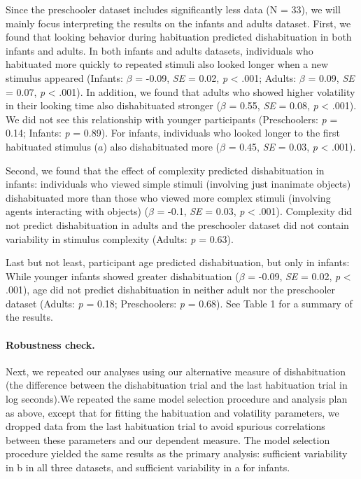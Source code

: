 \documentclass[10pt, letterpaper]{article}
\begin{document}
Since the preschooler dataset includes significantly less data (N = 33),
we will mainly focus interpreting the results on the infants and adults
dataset. First, we found that looking behavior during habituation
predicted dishabituation in both infants and adults. In both infants and
adults datasets, individuals who habituated more quickly to repeated
stimuli also looked longer when a new stimulus appeared (Infants:
\(\beta\) = -0.09, \emph{SE} = 0.02, \emph{p} \textless{} .001; Adults:
\(\beta\) = 0.09, \emph{SE} = 0.07, \emph{p} \textless{} .001). In
addition, we found that adults who showed higher volatility in their
looking time also dishabituated stronger (\(\beta\) = 0.55, \emph{SE} =
0.08, \emph{p} \textless{} .001). We did not see this relationship with
younger participants (Preschoolers: \emph{p} = 0.14; Infants: \emph{p} =
0.89). For infants, individuals who looked longer to the first
habituated stimulus (\(a\)) also dishabituated more (\(\beta\) = 0.45,
\emph{SE} = 0.03, \emph{p} \textless{} .001).

Second, we found that the effect of complexity predicted dishabituation
in infants: individuals who viewed simple stimuli (involving just
inanimate objects) dishabituated more than those who viewed more complex
stimuli (involving agents interacting with objects) (\(\beta\) = -0.1,
\emph{SE} = 0.03, \emph{p} \textless{} .001). Complexity did not predict
dishabituation in adults and the preschooler dataset did not contain
variability in stimulus complexity (Adults: \emph{p} = 0.63).

Last but not least, participant age predicted dishabituation, but only
in infants: While younger infants showed greater dishabituation
(\(\beta\) = -0.09, \emph{SE} = 0.02, \emph{p} \textless{} .001), age
did not predict dishabituation in neither adult nor the preschooler
dataset (Adults: \emph{p} = 0.18; Preschoolers: \emph{p} = 0.68). See
Table 1 for a summary of the results.

\hypertarget{robustness-check.}{%
\paragraph{Robustness check.}\label{robustness-check.}}

Next, we repeated our analyses using our alternative measure of
dishabituation (the difference between the dishabituation trial and the
last habituation trial in log seconds).We repeated the same model
selection procedure and analysis plan as above, except that for fitting
the habituation and volatility parameters, we dropped data from the last
habituation trial to avoid spurious correlations between these
parameters and our dependent measure. The model selection procedure
yielded the same results as the primary analysis: sufficient variability
in b in all three datasets, and sufficient variability in a for infants.
\end{document}
